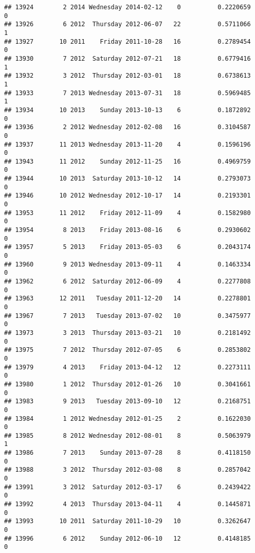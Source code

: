 \documentclass[
]{article}
\begin{document}
\begin{verbatim}
## 13924        2 2014 Wednesday 2014-02-12    0          0.2220659             0
## 13926        6 2012  Thursday 2012-06-07   22          0.5711066             1
## 13927       10 2011    Friday 2011-10-28   16          0.2789454             0
## 13930        7 2012  Saturday 2012-07-21   18          0.6779416             1
## 13932        3 2012  Thursday 2012-03-01   18          0.6738613             1
## 13933        7 2013 Wednesday 2013-07-31   18          0.5969485             1
## 13934       10 2013    Sunday 2013-10-13    6          0.1872892             0
## 13936        2 2012 Wednesday 2012-02-08   16          0.3104587             0
## 13937       11 2013 Wednesday 2013-11-20    4          0.1596196             0
## 13943       11 2012    Sunday 2012-11-25   16          0.4969759             0
## 13944       10 2013  Saturday 2013-10-12   14          0.2793073             0
## 13946       10 2012 Wednesday 2012-10-17   14          0.2193301             0
## 13953       11 2012    Friday 2012-11-09    4          0.1582980             0
## 13954        8 2013    Friday 2013-08-16    6          0.2930602             0
## 13957        5 2013    Friday 2013-05-03    6          0.2043174             0
## 13960        9 2013 Wednesday 2013-09-11    4          0.1463334             0
## 13962        6 2012  Saturday 2012-06-09    4          0.2277808             0
## 13963       12 2011   Tuesday 2011-12-20   14          0.2278801             0
## 13967        7 2013   Tuesday 2013-07-02   10          0.3475977             0
## 13973        3 2013  Thursday 2013-03-21   10          0.2181492             0
## 13975        7 2012  Thursday 2012-07-05    6          0.2853802             0
## 13979        4 2013    Friday 2013-04-12   12          0.2273111             0
## 13980        1 2012  Thursday 2012-01-26   10          0.3041661             0
## 13983        9 2013   Tuesday 2013-09-10   12          0.2168751             0
## 13984        1 2012 Wednesday 2012-01-25    2          0.1622030             0
## 13985        8 2012 Wednesday 2012-08-01    8          0.5063979             1
## 13986        7 2013    Sunday 2013-07-28    8          0.4118150             0
## 13988        3 2012  Thursday 2012-03-08    8          0.2857042             0
## 13991        3 2012  Saturday 2012-03-17    6          0.2439422             0
## 13992        4 2013  Thursday 2013-04-11    4          0.1445871             0
## 13993       10 2011  Saturday 2011-10-29   10          0.3262647             0
## 13996        6 2012    Sunday 2012-06-10   12          0.4148185             0

\end{verbatim}
\end{document}
